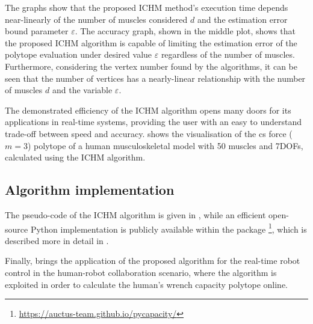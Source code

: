 The graphs show that the proposed ICHM method's execution time depends near-linearly of the number of muscles considered $d$ and the estimation error bound parameter $\varepsilon$. The accuracy graph, shown in the middle plot, shows that the proposed ICHM algorithm is capable of limiting the estimation error of the polytope evaluation under desired value $\varepsilon$ regardless of the number of muscles. Furthermore, considering the vertex number found by the algorithms, it can be seen that the number of vertices has a nearly-linear relationship with the number of muscles $d$ and the variable $\varepsilon$. 

The demonstrated efficiency of the ICHM algorithm opens many doors for its applications in real-time systems, providing the user with an easy to understand trade-off between speed and accuracy. 
 shows the visualisation of the \gls{cs} force ($m=3$) polytope of a human musculoskeletal model with 50 muscles and 7DOFs, calculated using the ICHM algorithm.


\newpage
\subsection{Algorithm implementation}
The pseudo-code of the ICHM algorithm is given in , while an efficient open-source Python implementation is publicly available within the package \footnote{\href{https://auctus-team.github.io/pycapacity/}{https://auctus-team.github.io/pycapacity/}}, which is described more in detail in .

Finally,  brings the application of the proposed algorithm for the real-time robot control in the human-robot collaboration scenario, where the algorithm is exploited in order to calculate the human's wrench capacity polytope online. 


